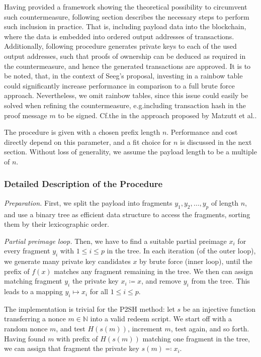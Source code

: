 \documentclass[a4paper,11pt,titlepage]{scrbook}
\begin{document}
Having provided a framework showing the theoretical possibility to circumvent such countermeasure, following section describes the necessary steps to perform such inclusion in practice.
That is, including payload data into the blockchain, where the data is embedded into ordered output addresses of transactions.
Additionally, following procedure generates private keys to each of the used output addresses, such that proofs of ownership can be deduced as required in the countermeasure, and hence the generated transactions are approved.
It is to be noted, that, in the context of Seeg's proposal, investing in a rainbow table could significantly increase performance in comparison to a full brute force approach.
Nevertheless, we omit rainbow tables, since this issue could easily be solved when refining the countermeasure, e.g.\@ including transaction hash in the proof message $m$ to be signed.
Cf.\@ the  in the approach proposed by Matzutt et al.\@ \cite[368--369]{matzutt_thwarting_2018}.

The procedure is given with a chosen prefix length $n$. Performance and cost directly depend on this parameter, and a fit choice for $n$ is discussed in the next section.
Without loss of generality, we assume the payload length to be a multiple of $n$.

\subsubsection*{Detailed Description of the Procedure}

\emph{Preparation.} First, we split the payload into fragments $y_1, y_2, \dots, y_p$ of length $n$, and use a binary tree as efficient data structure to access the fragments, sorting them by their lexicographic order.

\emph{Partial preimage loop.} 
Then, we have to find a suitable partial preimage $x_i$ for every fragment $y_i$ with $1\leq i \leq p$ in the tree.
In each iteration (of the outer loop), we generate many private key candidates $x$ by brute force (inner loop), until the prefix of $f(x)$ matches any fragment remaining in the tree.
We then can assign matching fragment $y_i$ the private key $x_i \coloneqq x$, and remove $y_i$ from the tree.
This leads to a mapping $y_i \mapsto x_i$ for all $1\leq i\leq p$.

The implementation is trivial for the P2SH method: let $s$ be an injective function transferring a nonce $m\in\mathbb{N}$ into a valid redeem script.
We start off with a random nonce $m$, and test $H(s(m))$, increment $m$, test again, and so forth.
Having found $m$ with prefix of $H(s(m))$ matching one fragment in the tree, we can assign that fragment the private key $s(m)\eqqcolon x_i$.
\end{document}
